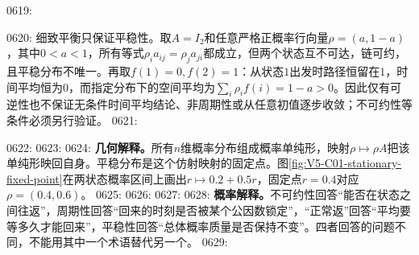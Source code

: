 0619: \begin{warningbox}
0620: 细致平衡只保证平稳性。取$A=I_2$和任意严格正概率行向量$\rho=(a,1-a)$，其中$0<a<1$，所有等式$\rho_i a_{ij}=\rho_j a_{ji}$都成立，但两个状态互不可达，链可约，且平稳分布不唯一。再取$f(1)=0,f(2)=1$：从状态$1$出发时路径恒留在$1$，时间平均恒为$0$，而指定分布下的空间平均为$\sum_i\rho_i f(i)=1-a>0$。因此仅有可逆性也不保证无条件时间平均结论、非周期性或从任意初值逐步收敛；不可约性等条件必须另行验证。
0621: \end{warningbox}
0622: 
0623: \label{struct:V5-C01-CH14}
0624: \textbf{几何解释。}所有$n$维概率分布组成概率单纯形，映射$\rho\mapsto\rho A$把该单纯形映回自身。平稳分布是这个仿射映射的固定点。图\ref{fig:V5-C01-stationary-fixed-point}在两状态概率区间上画出$r\mapsto0.2+0.5r$，固定点$r=0.4$对应$\rho=(0.4,0.6)$。
0625: 
0626: 
0627: \label{struct:V5-C01-CH15}
0628: \textbf{概率解释。}不可约性回答“能否在状态之间往返”，周期性回答“回来的时刻是否被某个公因数锁定”，“正常返”回答“平均要等多久才能回来”，平稳性回答“总体概率质量是否保持不变”。四者回答的问题不同，不能用其中一个术语替代另一个。
0629: 
